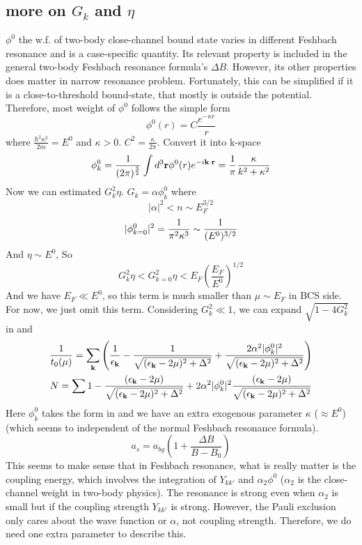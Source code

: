 \subsection{more on $G_{k}$ and $\eta$}
$\phi^{0}$ the w.f. of two-body close-channel bound state varies in different Feshbach resonance and is a case-specific quantity.  Its relevant property is included in the general two-body Feshbach resonance formula's $\Delta{B}$.  However, its other properties does matter in narrow resonance problem.  Fortunately, this can be simplified if it is a close-to-threshold bound-state, that mostly is outside the potential.  Therefore, most weight of $\phi^{0}$ follows the simple form 
\[
\phi^{0}(r)=C\frac{e^{-\kappa{r}}}{r}
\]
 where $\frac{\hbar^{2}\kappa^{2}}{2m}=E^{0}$ and $\kappa>0$.  $C^{2}=\frac{\kappa}{2\pi}$.  Convert it into k-space
 \begin{equation}\label{eq:20101011:phi}
\phi^{0}_k=\frac{1}{(2\pi)^{\frac32}}\int{d^{3}\ensuremath{\mathbf{r}}\phi^{0}(r)e^{-i\ensuremath{\mathbf{k}}\cdot\ensuremath{\mathbf{r}}}}=\frac{1}{\pi}\frac{\kappa}{k^{2}+\kappa^{2}}
\end{equation}
Now we can estimated $G_{k}^{2}\eta$. $G_{k}=\alpha\phi^{0}_{k}$ where 
\[|\alpha|^{2}<n\sim{E_{F}^{3/2}}\]
\[
\lvert{\phi^{0}_{k=0}}\rvert^{2}=\frac{1}{\pi^{2}\kappa^{3}}\sim\frac{1}{(E^{0})^{3/2}}
\]
And $\eta\sim{E^{0}}$, So 
\[
G_{k}^{2}\eta<G_{k=0}^{2}\eta<E_{F}(\frac{E_{F}}{E^{0}})^{1/2}
\]
And we have $E_{F}\ll{E^{0}}$, so this term is much smaller than $\mu\sim{E_{F}}$ in BCS side. For now, we just omit this term.  Considering $G_{k}^{2}\ll1$, we can expand $\sqrt{1-4G_{k}^{2}}$ in  and  
\begin{gather}
\frac{1}{{t_{0}}(\mu)}=\sum_{\mathbf{k}}
\left(\frac{1}{\epsilon_{\mathbf{k}}}-\frac{1}{\sqrt{{(\epsilon_{\mathbf{k}}-2\mu)^{2}+\Delta^{2}}}}
+\frac{2\alpha^{2}|\phi^{0}_{k}|^{2}}{\sqrt{{(\epsilon_{\mathbf{k}}-2\mu)^{2}+\Delta^{2}}}}\right)\label{eq:20101011:gapa}
\\
N=\sum{1-\frac{(\epsilon_{\ensuremath{\mathbf{k}}}-2\mu)}{{\sqrt{{(\epsilon_{\ensuremath{\mathbf{k}}}-2\mu)^{2}+\Delta^{2}}}}}
+2\alpha^{2}|\phi^{0}_{k}|^{2}\frac{(\epsilon_{\ensuremath{\mathbf{k}}}-2\mu)}{{\sqrt{{(\epsilon_{\ensuremath{\mathbf{k}}}-2\mu)^{2}+\Delta^{2}}}}}}
\label{eq:20101011:gapb}
\end{gather}
Here $\phi^{0}_{k}$ takes the form in  and we have an extra exogenous parameter $\kappa$ ($\approx{}E^{0}$) (which seems to independent of the normal Feshbach resonance formula).
\begin{equation}
a_{s}=a_{bg}(1+\frac{\Delta{B}}{B-B_{0}})
\end{equation}
This seems to make sense that in Feshbach resonance, what is really matter is the coupling energy, which involves  the integration of $Y_{kk'}$ and $\alpha_{2}\phi^{0}$ ($\alpha_{2}$ is the close-channel weight in two-body physics).  The resonance is strong even when $\alpha_{2}$ is small but if the coupling strength $Y_{kk'}$ is strong.  However, the Pauli exclusion only cares about the wave function or $\alpha$, not coupling strength.   Therefore, we do need one extra parameter to describe this.  

